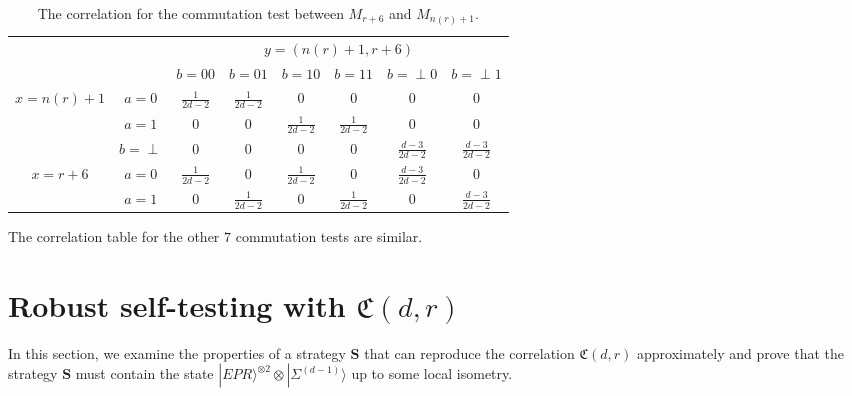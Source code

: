 \documentclass[11pt,letterpaper]{article}
\newcommand{\ket}[1]{|#1\rangle}
\newcommand{\x}{\otimes}
\newcommand{\1}{\mathbb{1}}
\newcommand{\EPR}[1]{\Sigma^{(#1)}}
\newcommand{\nr}{n(r)}
\newcommand{\fC}{\mathfrak{C}}
\newcommand{\bS}{\pmb{S}}
\theoremstyle{definition}
\begin{document}
\begin{table}[H]
\begin{center}
\begin{tabular}{|c|c||c|c|c|c|c|c|}
\hline
\multicolumn{2}{|c|}{} &
\multicolumn{6}{|c|}{$y=(\nr+1, r+6)$}\\
\cline{3-8}
\multicolumn{2}{|c|}{} &
$b = 00$ & $b=01$ & 
$b = 10$ & $b=11$ &
$b = \perp0$ & $b= \perp1$   \\
\hline
\hline
\multirow{3}{*}{$x = \nr+1$} & $a=0$ & $\frac{1}{2d-2}$ & $\frac{1}{2d-2}$ &  $0$
& $0$ & $0$ & $0$  \\
\cline{2-8}
&$a=1$ & $0$ & $0 $ & $\frac{1}{2d-2}$ 
&  $\frac{1}{2d-2}$ & $0$ & $0$  \\
\cline{2-8}
&$b=\perp$ & 0 & 0 & $0$ 
&  0 & $\frac{d-3}{2d-2}$ & $\frac{d-3}{2d-2} $  \\
\hline
\multirow{2}{*}{$x = r+6$} & $a=0$ & $\frac{1}{2d-2}$ & $0$ & $\frac{1}{2d-2}$ 
& $0$ & $\frac{d-3}{2d-2}$ & 0  \\
\cline{2-8}
&$a=1$ & $0$ & $\frac{1}{2d-2}$ & $0$ 
&  $\frac{1}{2d-2}$ & $0$ & $\frac{d-3}{2d-2}$  \\
\hline
\end{tabular}
\end{center}
\caption{The correlation for the commutation test between $M_{r+6}$ and $M_{\nr+1}$.}
\label{tbl:comm}
\end{table}
The correlation table for the other $7$ commutation tests are similar.

\section{Robust self-testing with $\fC(d,r)$}
\label{sec:main}
In this section, we examine the properties of a strategy $\bS$ that can reproduce the
correlation $\fC(d,r)$ approximately and 
prove that the strategy $\bS$ must contain the state $\ket{EPR}^{\x 2} \x \ket{\EPR{d-1}}$
up to some local isometry.
\end{document}
